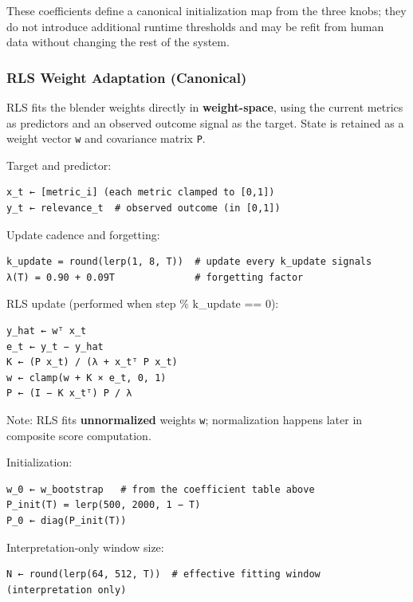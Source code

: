 \documentclass[
  letterpaper,
  DIV=11,
  numbers=noendperiod]{scrartcl}
\begin{document}
These coefficients define a canonical initialization map from the three
knobs; they do not introduce additional runtime thresholds and may be
refit from human data without changing the rest of the system.

\subsubsection{RLS Weight Adaptation
(Canonical)}\label{rls-weight-adaptation-canonical}

RLS fits the blender weights directly in \textbf{weight-space}, using
the current metrics as predictors and an observed outcome signal as the
target. State is retained as a weight vector \texttt{w} and covariance
matrix \texttt{P}.

Target and predictor:

\begin{verbatim}
x_t ← [metric_i] (each metric clamped to [0,1])
y_t ← relevance_t  # observed outcome (in [0,1])
\end{verbatim}

Update cadence and forgetting:

\begin{verbatim}
k_update = round(lerp(1, 8, T))  # update every k_update signals
λ(T) = 0.90 + 0.09T              # forgetting factor
\end{verbatim}

RLS update (performed when step \% k\_update == 0):

\begin{verbatim}
y_hat ← wᵀ x_t
e_t ← y_t − y_hat
K ← (P x_t) / (λ + x_tᵀ P x_t)
w ← clamp(w + K × e_t, 0, 1)
P ← (I − K x_tᵀ) P / λ
\end{verbatim}

Note: RLS fits \textbf{unnormalized} weights \texttt{w}; normalization
happens later in composite score computation.

Initialization:

\begin{verbatim}
w_0 ← w_bootstrap   # from the coefficient table above
P_init(T) = lerp(500, 2000, 1 − T)
P_0 ← diag(P_init(T))
\end{verbatim}

Interpretation-only window size:

\begin{verbatim}
N ← round(lerp(64, 512, T))  # effective fitting window (interpretation only)
\end{verbatim}
\end{document}
